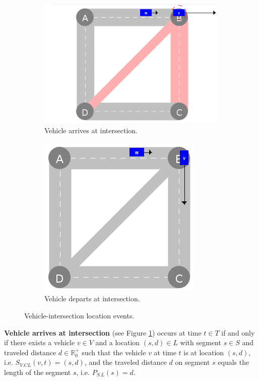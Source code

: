 \documentclass[graybox]{svmult}
\begin{document}
\begin{figure}[htbp]
	\centering
	\begin{subfigure}{.45\textwidth}
		\centering
		\includegraphics[scale=0.35]{../../events/vehicle-at-intersection-before.png}
		\caption{Vehicle arrives at intersection.}
		\label{fig:vehicle-at-intersection-before}
	\end{subfigure}
	\begin{subfigure}{.45\textwidth}
		\centering
		\includegraphics[scale=0.35]{../../events/vehicle-at-intersection-after.png}
		\caption{Vehicle departs at intersection.}
		\label{fig:vehicle-at-intersection-after}
	\end{subfigure}
	\caption{Vehicle-intersection location events.}
	\label{fig:routing-events}
\end{figure}

\noindent \textbf{Vehicle arrives at intersection} (see Figure \ref{fig:vehicle-at-intersection-before}) occurs at time $t \in T$ if and only if there exists a vehicle $v \in V$ and a location $(s,d) \in L$ with segment $s \in S$ and traveled distance $d \in \mathbb{R}_0^+$ such that the vehicle $v$ at time $t$ is at location $(s,d)$, i.e. $S_{V.CL}(v,t) = (s,d)$, and the traveled distance $d$ on segment $s$ equals the length of the segment $s$, i.e. $P_{S.L}(s) = d$.
\end{document}

